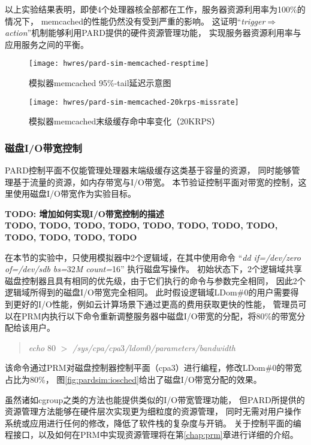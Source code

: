 以上实验结果表明，即使4个处理器核全部都在工作，服务器资源利用率为100\%的情况下，
memcached的性能仍然没有受到严重的影响。
这证明``\emph{trigger$\Rightarrow$action}''机制能够利用PARD提供的硬件资源管理功能，
实现服务器资源利用率与应用服务之间的平衡。

\begin{figure}[tb]
\begin{minipage}{0.48\textwidth}
  \centering
  \texttt{[image: hwres/pard-sim-memcached-resptime]}
  \caption{模拟器memcached 95\%-tail延迟示意图}
  \label{fig:pardsim:memcached-resptime}
\end{minipage}\hfill
\begin{minipage}{0.48\textwidth}
  \centering
  \texttt{[image: hwres/pard-sim-memcached-20krps-missrate]}
  \caption{模拟器memcached末级缓存命中率变化（20KRPS）}
  \label{fig:pardsim:memcached-20krps-missrate}
\end{minipage}
\end{figure}


\subsubsection{磁盘I/O带宽控制}

PARD控制平面不仅能管理处理器末端级缓存这类基于容量的资源，
同时能够管理基于流量的资源，如内存带宽与I/O带宽。
本节验证控制平面对带宽的控制，这里使用磁盘I/O带宽作为实验目标。

\textbf{TODO: 增加如何实现I/O带宽控制的描述}\\
\textbf{TODO, TODO, TODO, TODO, TODO, TODO, TODO, TODO, TODO, TODO, TODO, TODO}

在本节的实验中，只使用模拟器中2个逻辑域，在其中使用命令
``\textit{dd if=/dev/zero of=/dev/sdb bs=}32\textit{M count=}16''
执行磁盘写操作。
初始状态下，2个逻辑域共享磁盘控制器且具有相同的优先级，由于它们执行的命令与参数完全相同，
因此2个逻辑域所得到的磁盘I/O带宽完全相同。
此时假设逻辑域LDom\#0的用户需要得到更好的I/O性能，例如云计算场景下通过更高的费用获取更快的性能，
管理员可以在PRM内执行以下命令重新调整服务器中磁盘I/O带宽的分配，将80\%的带宽分配给该用户。
\begin{verse}
\textit{echo} 80 \textit{$>$ /sys/cpa/cpa}3\textit{/ldom}0\textit{/parameters/bandwidth}
\end{verse}

该命令通过PRM对磁盘控制器控制平面（cpa3）进行编程，修改LDom\#0的带宽占比为80\%，
图\ref{fig:pardsim:iosched}给出了磁盘I/O带宽分配的效果。

虽然诸如cgroup\cite{cgroup}之类的方法也能提供类似的I/O带宽管理功能，
但PARD所提供的资源管理方法能够在硬件层次实现更为细粒度的资源管理，
同时无需对用户操作系统或应用进行任何的修改，降低了软件栈的复杂度与开销。
关于控制平面的编程接口，以及如何在PRM中实现资源管理将在第\ref{chap:prm}章进行详细的介绍。

